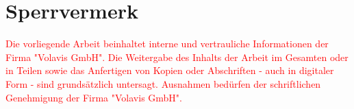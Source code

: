 
\section*{Sperrvermerk}
\textcolor{red}{
Die vorliegende Arbeit beinhaltet interne und vertrauliche Informationen der Firma "Volavis GmbH".
Die Weitergabe des Inhalts der Arbeit im Gesamten oder in Teilen sowie das Anfertigen
von Kopien oder Abschriften - auch in digitaler Form - sind grundsätzlich untersagt.
Ausnahmen bedürfen der schriftlichen Genehmigung der Firma "Volavis GmbH".
}